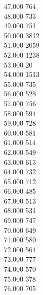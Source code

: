 { 47.000	764 \\
 48.000	733 \\
 49.000	751 \\
 50.000	3812 \\
 51.000	2059 \\
 52.000	1238 \\
 53.000	20 \\
 54.000	1513 \\
 55.000	735 \\
 56.000	528 \\
 57.000	756 \\
 58.000	594 \\
 59.000	728 \\
 60.000	581 \\
 61.000	514 \\
 62.000	549 \\
 63.000	613 \\
 64.000	732 \\
 65.000	712 \\
 66.000	485 \\
 67.000	513 \\
 68.000	531 \\
 69.000	747 \\
 70.000	649 \\
 71.000	580 \\
 72.000	564 \\
 73.000	777 \\
 74.000	570 \\
 75.000	378 \\
 76.000	705 \\
}

